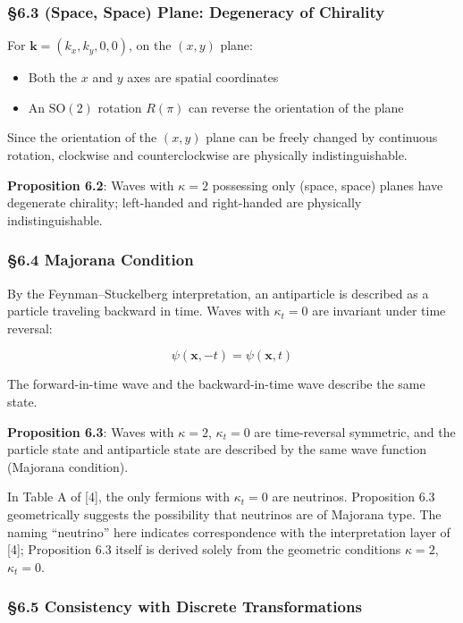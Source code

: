 \documentclass[
  a4paper,11pt]{article}
\providecommand{\tightlist}{%
  \setlength{\itemsep}{0pt}\setlength{\parskip}{0pt}}
\theoremstyle{definition}
\theoremstyle{remark}
\begin{document}
\subsubsection{§6.3 (Space, Space) Plane: Degeneracy of
Chirality}\label{space-space-plane-degeneracy-of-chirality}

For \(\mathbf{k} = (k_x, k_y, 0, 0)\), on the \((x, y)\) plane:

\begin{itemize}
\tightlist
\item
  Both the \(x\) and \(y\) axes are spatial coordinates
\item
  An \(\mathrm{SO}(2)\) rotation \(R(\pi)\) can reverse the orientation
  of the plane
\end{itemize}

Since the orientation of the \((x, y)\) plane can be freely changed by
continuous rotation, clockwise and counterclockwise are physically
indistinguishable.

\textbf{Proposition 6.2}: Waves with \(\kappa = 2\) possessing only
(space, space) planes have degenerate chirality; left-handed and
right-handed are physically indistinguishable.

\subsubsection{§6.4 Majorana Condition}\label{majorana-condition}

By the Feynman--Stuckelberg interpretation, an antiparticle is described
as a particle traveling backward in time. Waves with \(\kappa_t = 0\)
are invariant under time reversal:

\[\psi(\mathbf{x}, -t) = \psi(\mathbf{x}, t)\]

The forward-in-time wave and the backward-in-time wave describe the same
state.

\textbf{Proposition 6.3}: Waves with \(\kappa = 2\), \(\kappa_t = 0\)
are time-reversal symmetric, and the particle state and antiparticle
state are described by the same wave function (Majorana condition).

In Table A of {[}4{]}, the only fermions with \(\kappa_t = 0\) are
neutrinos. Proposition 6.3 geometrically suggests the possibility that
neutrinos are of Majorana type. The naming ``neutrino'' here indicates
correspondence with the interpretation layer of {[}4{]}; Proposition 6.3
itself is derived solely from the geometric conditions \(\kappa = 2\),
\(\kappa_t = 0\).

\subsubsection{§6.5 Consistency with Discrete
Transformations}\label{consistency-with-discrete-transformations}
\end{document}
